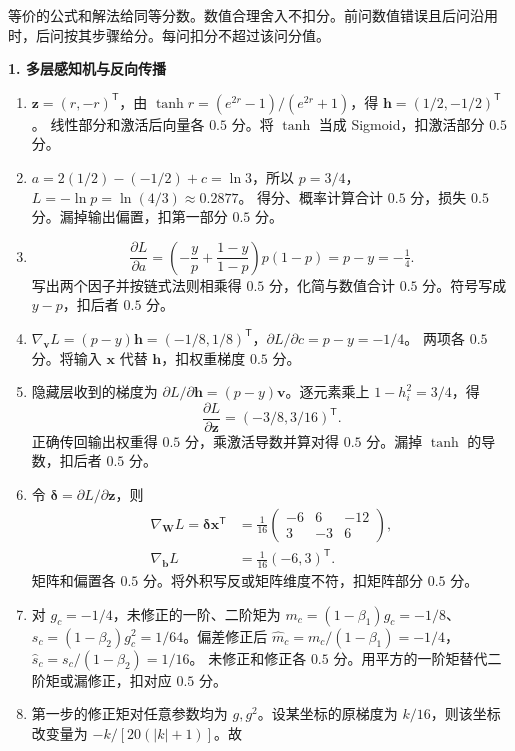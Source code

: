 
\noindent 等价的公式和解法给同等分数。数值合理舍入不扣分。前问数值错误且后问沿用时，后问按其步骤给分。每问扣分不超过该问分值。

\noindent\textbf{1. 多层感知机与反向传播}

\begin{enumerate}[label=(\arabic*)]
\item $\bm{z}=(r,-r)^{\mathsf T}$，由 $\tanh r=(e^{2r}-1)/(e^{2r}+1)$，得 $\bm{h}=(1/2,-1/2)^{\mathsf T}$。
线性部分和激活后向量各 $0.5$ 分。将 $\tanh$ 当成 Sigmoid，扣激活部分 $0.5$ 分。
\item $a=2(1/2)-(-1/2)+c=\ln 3$，所以 $p=3/4$，$L=-\ln p=\ln(4/3)\approx0.2877$。
得分、概率计算合计 $0.5$ 分，损失 $0.5$ 分。漏掉输出偏置，扣第一部分 $0.5$ 分。
\item
\[
\frac{\partial L}{\partial a}
=\left(-\frac{y}{p}+\frac{1-y}{1-p}\right)p(1-p)=p-y=-\tfrac14.
\]
写出两个因子并按链式法则相乘得 $0.5$ 分，化简与数值合计 $0.5$ 分。符号写成 $y-p$，扣后者 $0.5$ 分。
\item $\nabla_{\bm{v}}L=(p-y)\bm{h}=(-1/8,1/8)^{\mathsf T}$，$\partial L/\partial c=p-y=-1/4$。
两项各 $0.5$ 分。将输入 $\bm{x}$ 代替 $\bm{h}$，扣权重梯度 $0.5$ 分。
\item 隐藏层收到的梯度为 $\partial L/\partial\bm{h}=(p-y)\bm{v}$。逐元素乘上 $1-h_i^2=3/4$，得
\[
\frac{\partial L}{\partial\bm{z}}=(-3/8,3/16)^{\mathsf T}.
\]
正确传回输出权重得 $0.5$ 分，乘激活导数并算对得 $0.5$ 分。漏掉 $\tanh$ 的导数，扣后者 $0.5$ 分。
\item 令 $\bm{\delta}=\partial L/\partial\bm{z}$，则
\begin{align*}
\nabla_{\bm{W}}L=\bm{\delta}\bm{x}^{\mathsf T}
&=\tfrac1{16}\begin{pmatrix}-6&6&-12\\3&-3&6\end{pmatrix},\\
\nabla_{\bm{b}}L&=\tfrac1{16}(-6,3)^{\mathsf T}.
\end{align*}
矩阵和偏置各 $0.5$ 分。将外积写反或矩阵维度不符，扣矩阵部分 $0.5$ 分。
\item 对 $g_c=-1/4$，未修正的一阶、二阶矩为 $m_c=(1-\beta_1)g_c=-1/8$、$s_c=(1-\beta_2)g_c^2=1/64$。偏差修正后 $\widehat m_c=m_c/(1-\beta_1)=-1/4$，$\widehat s_c=s_c/(1-\beta_2)=1/16$。
未修正和修正各 $0.5$ 分。用平方的一阶矩替代二阶矩或漏修正，扣对应 $0.5$ 分。
\item 第一步的修正矩对任意参数均为 $g,g^2$。设某坐标的原梯度为 $k/16$，则该坐标改变量为 $-k/[20(|k|+1)]$。故

\end{enumerate}
